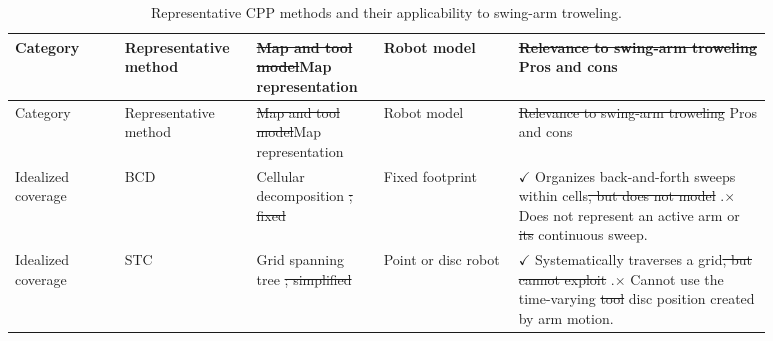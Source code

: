 \documentclass[a4paper,11pt]{article}
\makeatletter
\providecommand{\DIFaddtex}[1]{{\protect\color{blue}#1}} %
\providecommand{\DIFdeltex}[1]{{\protect\color{red}\sout{#1}}} %
\providecommand{\DIFaddbegin}{} %
\providecommand{\DIFaddend}{} %
\providecommand{\DIFdelbegin}{} %
\providecommand{\DIFdelend}{} %
\providecommand{\DIFadd}[1]{\texorpdfstring{\DIFaddtex{#1}}{#1}} %
\providecommand{\DIFdel}[1]{\texorpdfstring{\DIFdeltex{#1}}{}} %
\let\sout@orig\sout %
\renewcommand{\sout}[1]{\ifmmode\text{\sout@orig{\ensuremath{#1}}}\else\sout@orig{#1}\fi} %
\makeatother
\begin{document}
\DIFdelbegin %
\DIFdelend \DIFaddbegin \begin{longtable}{@{}>{\raggedright\arraybackslash}p{0.13\linewidth}>{\raggedright\arraybackslash}p{0.15\linewidth}>{\raggedright\arraybackslash}p{0.14\linewidth}>{\raggedright\arraybackslash}p{0.16\linewidth}>{\raggedright\arraybackslash}p{0.30\linewidth}@{}}
\DIFaddend \caption{Representative CPP methods and their applicability to swing-arm troweling.}\label{tab:cpp-comparison}\\
\toprule
Category & Representative method & \DIFdelbegin \DIFdel{Map and tool model}\DIFdelend \DIFaddbegin \DIFadd{Map representation }& \DIFadd{Robot model}\DIFaddend & \DIFdelbegin \DIFdel{Relevance to swing-arm troweling }\DIFdelend \DIFaddbegin \DIFadd{Pros and cons }\DIFaddend \\
\midrule
\endfirsthead
\toprule
Category & Representative method & \DIFdelbegin \DIFdel{Map and tool model}\DIFdelend \DIFaddbegin \DIFadd{Map representation }& \DIFadd{Robot model}\DIFaddend & \DIFdelbegin \DIFdel{Relevance to swing-arm troweling }\DIFdelend \DIFaddbegin \DIFadd{Pros and cons }\DIFaddend \\
\midrule
\endhead
Idealized coverage & BCD \cite{choset1998} & Cellular decomposition \DIFdelbegin \DIFdel{; fixed }\DIFdelend \DIFaddbegin & \DIFadd{Fixed }\DIFaddend footprint & \DIFaddbegin \DIFadd{$\checkmark$ }\DIFaddend Organizes back-and-forth sweeps within cells\DIFdelbegin \DIFdel{, but does not model }\DIFdelend \DIFaddbegin \DIFadd{.}\newline \DIFadd{$\times$ Does not represent }\DIFaddend an active arm or \DIFdelbegin \DIFdel{its }\DIFdelend continuous sweep. \\
Idealized coverage & STC \cite{gabriely2001} & Grid spanning tree \DIFdelbegin \DIFdel{; simplified }\DIFdelend \DIFaddbegin & \DIFadd{Point or disc }\DIFaddend robot & \DIFaddbegin \DIFadd{$\checkmark$ }\DIFaddend Systematically traverses a grid\DIFdelbegin \DIFdel{, but cannot exploit }\DIFdelend \DIFaddbegin \DIFadd{.}\newline \DIFadd{$\times$ Cannot use }\DIFaddend the time-varying \DIFdelbegin \DIFdel{tool }\DIFdelend \DIFaddbegin \DIFadd{disc }\DIFaddend position created by arm motion. \\

\end{longtable}
\end{document}
